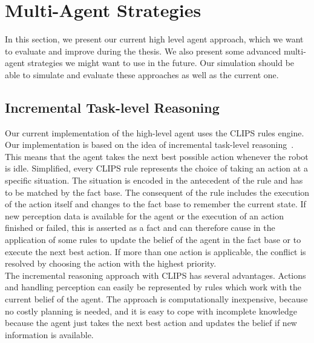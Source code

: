 \section{Multi-Agent Strategies}
\label{sec:multi_agent_strategies}
In this section, we present our current high level agent approach, which we want to evaluate and improve during the thesis. We also present some advanced multi-agent strategies we might want to use in the future. Our simulation should be able to simulate and evaluate these approaches as well as the current one.

\subsection{Incremental Task-level Reasoning}
Our current implementation of the high-level agent uses the CLIPS rules engine. Our implementation is based on the idea of incremental task-level reasoning~\cite{Incremental}. This means that the agent takes the next best possible action whenever the robot is idle. Simplified, every CLIPS rule represents the choice of taking an action at a specific situation. The situation is encoded in the antecedent of the rule and has to be matched by the fact base. The consequent of the rule includes the execution of the action itself and changes to the fact base to remember the current state. If new perception data is available for the agent or the execution of an action finished or failed, this is asserted as a fact and can therefore cause in the application of some rules to update the belief of the agent in the fact base or to execute the next best action. If more than one action is applicable, the conflict is resolved by choosing the action with the highest priority.\\
The incremental reasoning approach with CLIPS has several advantages. Actions and handling perception can easily be represented by rules which work with the current belief of the agent. The approach is computationally inexpensive, because no costly planning is needed, and it is easy to cope with incomplete knowledge because the agent just takes the next best action and updates the belief if new information is available.\\
